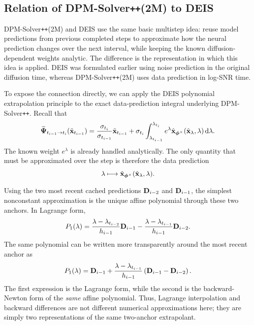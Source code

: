 \subsection{Relation of DPM-Solver\texttt{++}(2M) to DEIS}
\label{subsec:dpm-deis}

DPM-Solver\texttt{++}(2M) and DEIS use the same basic multistep idea:
reuse model predictions from previous completed steps to approximate how the
neural prediction changes over the next interval, while keeping the known
diffusion-dependent weights analytic. The difference is the representation in
which this idea is applied. DEIS was formulated earlier using noise prediction
in the original diffusion time, whereas DPM-Solver\texttt{++}(2M) uses data
prediction in log-SNR time.

To expose the connection directly, we can apply the DEIS polynomial
extrapolation principle to the exact data-prediction integral underlying
DPM-Solver\texttt{++}. Recall that
\[
\widetilde{{\bm{\Psi}}}_{t_{i-1}\to t_i}
(\tilde{{\mathbf{x}}}_{t_{i-1}})
=
\frac{\sigma_{t_i}}{\sigma_{t_{i-1}}}
\tilde{{\mathbf{x}}}_{t_{i-1}}
+
\sigma_{t_i}
\int_{\lambda_{t_{i-1}}}^{\lambda_{t_i}}
e^\lambda
\hat{{\mathbf{x}}}_{\bm{\phi}^\times}
(\hat{{\mathbf{x}}}_\lambda,\lambda)
\mathop{}\!\mathrm{d}\lambda.
\]
The known weight $e^\lambda$ is already handled analytically. The only
quantity that must be approximated over the step is therefore the data
prediction
\[
\lambda
\longmapsto
\hat{{\mathbf{x}}}_{\bm{\phi}^\times}
(\hat{{\mathbf{x}}}_\lambda,\lambda).
\]

Using the two most recent cached predictions
${\mathbf{D}}_{i-2}$ and ${\mathbf{D}}_{i-1}$, the simplest nonconstant approximation is the
unique affine polynomial through these two anchors. In Lagrange form,
\[
P_1(\lambda)
=
\frac{
\lambda-\lambda_{t_{i-2}}
}{
h_{i-1}
}
{\mathbf{D}}_{i-1}
-
\frac{
\lambda-\lambda_{t_{i-1}}
}{
h_{i-1}
}
{\mathbf{D}}_{i-2}.
\]
The same polynomial can be written more transparently around the most recent
anchor as
\[
P_1(\lambda)
=
{\mathbf{D}}_{i-1}
+
\frac{
\lambda-\lambda_{t_{i-1}}
}{
h_{i-1}
}
\left(
{\mathbf{D}}_{i-1}-{\mathbf{D}}_{i-2}
\right).
\]
The first expression is the Lagrange form, while the second is the
backward-Newton form of the \emph{same} affine polynomial. Thus, Lagrange
interpolation and backward differences are not different numerical
approximations here; they are simply two representations of the same
two-anchor extrapolant.

